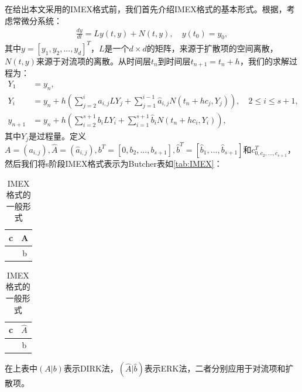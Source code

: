 在给出本文采用的IMEX格式前，我们首先介绍IMEX格式的基本形式。根据\parencite{calvo2001linearly}，考虑常微分系统：
\begin{align}
    \frac{dy}{dt} = Ly(t,y) + N(t,y), \quad y(t_0) = y_0,
\end{align}
其中$y = [y_1, y_2, ..., y_d]^T$，$L$是一个$d\times d$的矩阵，来源于扩散项的空间离散，$N(t,y)$来源于对流项的离散。从时间层$t_n$到时间层$t_{n+1}=t_n+h$，我们的求解过程为：
\begin{align*}
    Y_1     & =y_n,                                                                                                        \\
    Y_i     & = y_n + h(\sum_{j=2}^i a_{i,j}LY_j + \sum_{j=1}^{i-1}\hat{a}_{i,j}N(t_n+hc_j,Y_j)), \quad 2 \leq i \leq s+1, \\
    y_{n+1} & = y_n + h(\sum_{i=2}^{s+1}b_iLY_i+\sum_{i=1}^{s+1}\hat{b}_iN(t_n+hc_i, Y_i)),
\end{align*}
其中$Y_j$是过程量。定义$A = (a_{i,j}), \hat{A} = (\hat{a}_{i,j}), b^T = [0, b_2, ..., b_{s+1}], \hat{b}^T=[\hat{b}_1,...,\hat{b}_{s+1}]$和$c^T_{0, c_2, ..., c_{s+1}}$，然后我们将s阶段IMEX格式表示为Butcher表如\autoref{tab:IMEX}：
\begin{table}
    \centering
    \begin{minipage}{0.45\linewidth}
        \centering
        \begin{tabular}{c|c}
            c & A \\
            \hline
              & b
        \end{tabular}
    \end{minipage}
    \begin{minipage}{0.45\linewidth}
        \centering
        \begin{tabular}{c|c}
            c & $\hat{A}$ \\
            \hline
              & b
        \end{tabular}
    \end{minipage}
    \caption{IMEX格式的一般形式}
    \label{tab:IMEX}
\end{table}
在上表中$(A|b)$表示DIRK法，$(\hat{A}|\hat{b})$表示ERK法，二者分别应用于对流项和扩散项。

